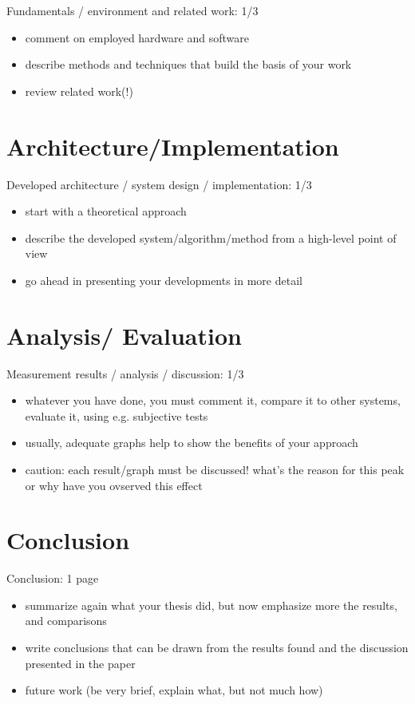Fundamentals / environment and related work: 1/3

\begin{itemize}
    \item comment on employed hardware and software
    \item describe methods and techniques that build the basis of your work
    \item review related work(!)
\end{itemize}

\chapter{Architecture/Implementation}

Developed architecture / system design / implementation: 1/3

\begin{itemize}
    \item start with a theoretical approach
    \item describe the developed system/algorithm/method from a high-level point of view
    \item go ahead in presenting your developments in more detail
\end{itemize}


\chapter{Analysis/ Evaluation}

Measurement results / analysis / discussion: 1/3

\begin{itemize}
    \item whatever you have done, you must comment it, compare it to other systems, evaluate it, using e.g. subjective tests
    \item usually, adequate graphs help to show the benefits of your approach
    \item caution: each result/graph must be discussed! what's the reason for this peak or why have you ovserved this effect
\end{itemize}


\chapter{Conclusion}

Conclusion: 1 page

\begin{itemize}
    \item summarize again what your thesis did, but now emphasize more the results, and comparisons
    \item write conclusions that can be drawn from the results found and the discussion presented in the paper
    \item future work (be very brief, explain what, but not much how)
\end{itemize}

